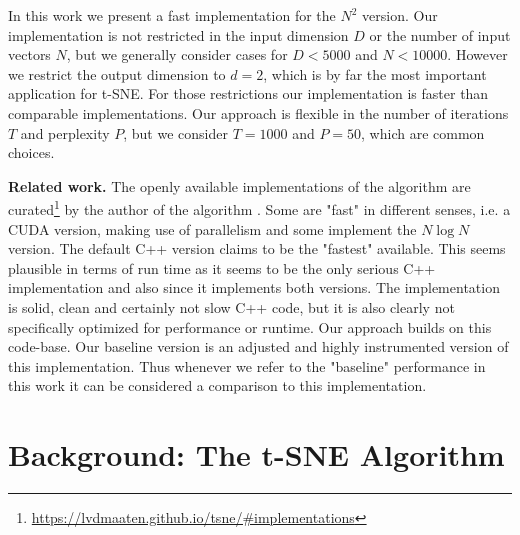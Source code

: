 \documentclass[letterpaper]{article}
\newcommand{\mypar}[1]{{\bf #1.}}
\begin{document}
In this work we present a fast implementation for the $N^2$ version. Our implementation is not restricted in the input dimension $D$ or the number of input vectors $N$, but we generally consider cases for $D < 5000$ and $N < 10000$. However we restrict the output dimension to $d=2$, which is by far the most important application for t-SNE. For those restrictions our implementation is faster than comparable implementations. Our approach is flexible in the number of iterations $T$ and perplexity $P$, but we consider $T= 1000$ and $P = 50$, which are common choices.

\mypar{Related work}
The openly available implementations of the algorithm are curated\footnote{\url{https://lvdmaaten.github.io/tsne/\#implementations}} by the author of the algorithm \cite{maaten_visualizing_2008, van_der_maaten_accelerating_2014}. Some are "fast" in different senses, i.e. a CUDA version, making use of parallelism and some implement the $N \log N$ version. The default C++ version claims to be the "fastest" available. This seems plausible in terms of run time as it seems to be the only serious C++ implementation and also since it implements both versions. The implementation is solid, clean and certainly not slow C++ code, but it is also clearly not specifically optimized for performance or runtime.
Our approach builds on this code-base. Our baseline version is an adjusted and highly instrumented version of this implementation. Thus whenever we refer to the "baseline" performance in this work it can be considered a comparison to this implementation.

\section{Background: The t-SNE Algorithm}\label{sec:background}
\end{document}

